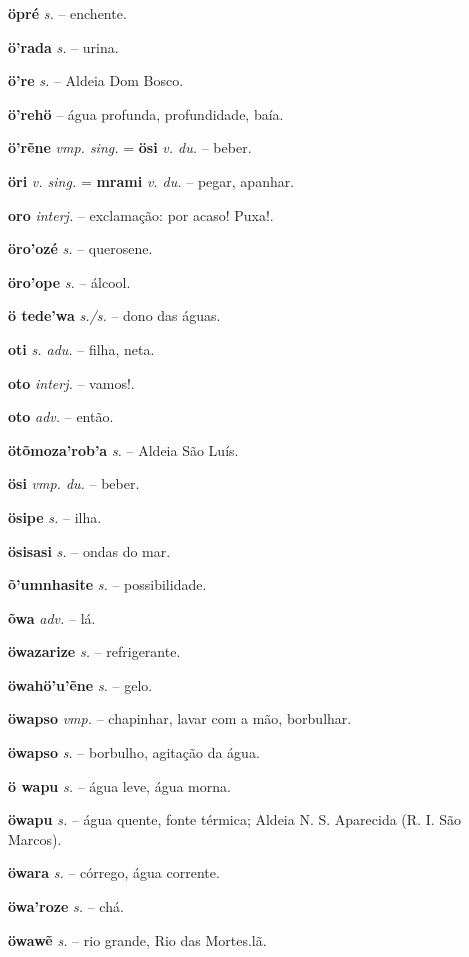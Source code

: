 \textbf{öpré} \textit{s.} -- enchente.

\textbf{ö'rada} \textit{s.} -- urina.

\textbf{ö're} \textit{s.} -- Aldeia Dom Bosco.

\textbf{ö'rehö} -- água profunda, profundidade, baía.

\textbf{ö'rẽne} \textit{vmp. sing.} = \textbf{ösi} \textit{v. du.} -- beber.

\textbf{öri} \textit{v. sing.} = \textbf{mrami} \textit{v. du.} -- pegar, apanhar.

\textbf{oro} \textit{interj.} -- exclamação: por acaso! Puxa!.

\textbf{öro'ozé} \textit{s.} -- querosene.

\textbf{öro'ope} \textit{s.} -- álcool.

\textbf{ö tede'wa} \textit{s./s.} -- dono das águas.

\textbf{oti} \textit{s. adu.} -- filha, neta.

\textbf{oto} \textit{interj.} -- vamos!.

\textbf{oto} \textit{adv.} -- então.

\textbf{ötõmoza'rob'a} \textit{s.} -- Aldeia São Luís.

\textbf{ösi} \textit{vmp. du.} -- beber.

\textbf{ösipe} \textit{s.} -- ilha.

\textbf{ösisasi} \textit{s.} -- ondas do mar.

\textbf{õ'umnhasite} \textit{s.} -- possibilidade.

\textbf{õwa} \textit{adv.} -- lá.

\textbf{öwazarize} \textit{s.} -- refrigerante.

\textbf{öwahö'u'ẽne} \textit{s.} -- gelo.

\textbf{öwapso} \textit{vmp.} -- chapinhar, lavar com a mão, borbulhar.

\textbf{öwapso} \textit{s.} -- borbulho, agitação da água.

\textbf{ö wapu} \textit{s.} -- água leve, água morna.

\textbf{öwapu} \textit{s.} -- água quente, fonte térmica; Aldeia N. S. Aparecida (R. I. São Marcos).

\textbf{öwara} \textit{s.} -- córrego, água corrente.

\textbf{öwa'roze} \textit{s.} -- chá.

\textbf{öwawẽ} \textit{s.} -- rio grande, Rio das Mortes.lã.

